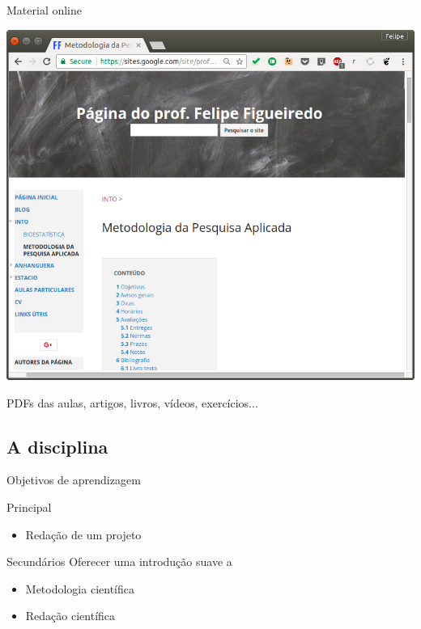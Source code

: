 \documentclass{beamer}
\begin{document}
\begin{frame}{Material online}
  \begin{center}
    \includegraphics[height=.7\textheight]{Intro/pg-disciplina}
    \begin{exampleblock}{}
      \begin{center}
        PDFs das aulas, artigos, livros, vídeos, exercícios...
      \end{center}
    \end{exampleblock}
  \end{center}
\end{frame}

\subsection{A disciplina}

\begin{frame}[label=objetivo]{Objetivos de aprendizagem}

  \begin{block}{Principal}
    \begin{itemize}
    \item Redação de um projeto
    \end{itemize}
  \end{block}

  \begin{block}{Secundários}
    Oferecer uma introdução suave a
    \begin{itemize}
    \item Metodologia científica
    \item Redação científica
    \end{itemize}
  \end{block}

\end{frame}
\end{document}
